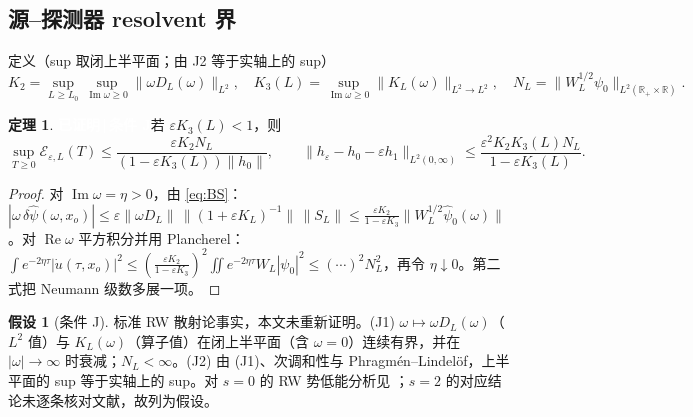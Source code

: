 \documentclass[11pt,a4paper,fontset=windows]{ctexart}
\newcommand{\tagbox}[2]{\begingroup\setlength{\fboxsep}{1.4pt}\colorbox{#1}{\textcolor{white}{\footnotesize\bfseries #2}}\endgroup}
\newcommand{\condJ}{\tagbox{blue!65!black}{已证明\,|\,条件 J}}
\theoremstyle{definition}
\newtheorem{theorem}{定理}
\theoremstyle{definition}
\newtheorem{assumption}{假设}
\newcommand{\eps}{\varepsilon}
\newcommand{\cE}{\mathcal E}
\renewcommand{\Im}{\operatorname{Im}}
\renewcommand{\Re}{\operatorname{Re}}
\begin{document}
\subsection{源--探测器 resolvent 界}
定义（sup 取闭上半平面；由 J2 等于实轴上的 sup）
\[
K_2=\sup_{L\ge L_0}\sup_{\Im\omega\ge0}\|\omega D_L(\omega)\|_{L^2},\quad
K_3(L)=\sup_{\Im\omega\ge0}\|K_L(\omega)\|_{L^2\to L^2},\quad
N_L=\|W_L^{1/2}\psi_0\|_{L^2(\mathbb R_+\times\mathbb R)} .
\]
\begin{theorem}\label{thm:B}\condJ\enspace 若 $\eps K_3(L)<1$，则
\[
\sup_{T\ge0}\cE_{\eps,L}(T)\le\frac{\eps K_2N_L}{(1-\eps K_3(L))\|h_0\|},\qquad
\|h_\eps-h_0-\eps h_1\|_{L^2(0,\infty)}\le\frac{\eps^2K_2K_3(L)N_L}{1-\eps K_3(L)} .
\]
\end{theorem}
\begin{proof}
对 $\Im\omega=\eta>0$，由 \eqref{eq:BS}：$|\omega\,\delta\hat\psi(\omega,x_o)|\le\eps\|\omega D_L\|\,\|(1+\eps K_L)^{-1}\|\,\|S_L\|\le\frac{\eps K_2}{1-\eps K_3}\|W_L^{1/2}\hat\psi_0(\omega)\|$。对 $\Re\omega$ 平方积分并用 Plancherel：$\int e^{-2\eta\tau}|\dot u(\tau,x_o)|^2\le(\frac{\eps K_2}{1-\eps K_3})^2\iint e^{-2\eta\tau}W_L|\psi_0|^2\le(\cdots)^2N_L^2$，再令 $\eta\downarrow0$。第二式把 Neumann 级数多展一项。
\end{proof}
\begin{assumption}[条件 J]标准 RW 散射论事实，本文未重新证明。(J1) $\omega\mapsto\omega D_L(\omega)$（$L^2$ 值）与 $K_L(\omega)$（算子值）在闭上半平面（含 $\omega=0$）连续有界，并在 $|\omega|\to\infty$ 时衰减；$N_L<\infty$。(J2) 由 (J1)、次调和性与 Phragmén--Lindelöf，上半平面的 sup 等于实轴上的 sup。对 $s=0$ 的 RW 势低能分析见 \cite{DSS}；$s=2$ 的对应结论未逐条核对文献，故列为假设。
\end{assumption}
\end{document}
